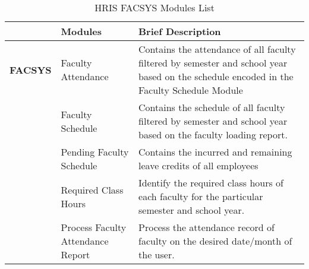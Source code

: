 \begin{table}[H]
\begin{tabular}{@{}p{2cm}p{3.5cm}p{9cm}@{}}
\toprule
\multicolumn{1}{l}{} & \textbf{Modules}                  & \textbf{Brief Description}                                                                                                               \\ \midrule
\textbf{FACSYS}      & Faculty Attendance                & Contains the attendance of all faculty filtered by semester and school year based on the schedule encoded in the Faculty Schedule Module \\
                        & Faculty Schedule                  & Contains the schedule of all faculty filtered by semester and school year based on the faculty loading report.                           \\
                        & Pending Faculty Schedule          & Contains the incurred and remaining leave credits of all employees                                                                       \\
                        & Required Class Hours              & Identify the required class hours of each faculty for the particular semester and school year.                                           \\
                        & Process Faculty Attendance Report & Process the attendance record of faculty on the desired date/month of the user.                                                          \\ \bottomrule
\end{tabular}
\caption{HRIS FACSYS Modules List}
\label{tab:hris-facsys-modules}
\end{table}
    